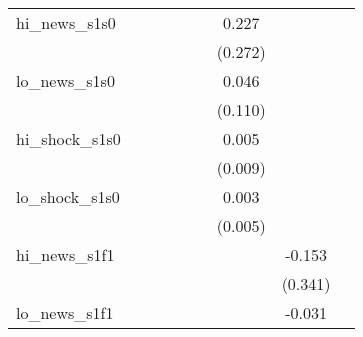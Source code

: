 {\begin{tabular}{l*{8}{c}}
\addlinespace
hi\_news\_s1s0&                     &                     &                     &                     &                     &       0.227         &                     &                     \\
            &                     &                     &                     &                     &                     &     (0.272)         &                     &                     \\
\addlinespace
lo\_news\_s1s0&                     &                     &                     &                     &                     &       0.046         &                     &                     \\
            &                     &                     &                     &                     &                     &     (0.110)         &                     &                     \\
\addlinespace
hi\_shock\_s1s0&                     &                     &                     &                     &                     &       0.005         &                     &                     \\
            &                     &                     &                     &                     &                     &     (0.009)         &                     &                     \\
\addlinespace
lo\_shock\_s1s0&                     &                     &                     &                     &                     &       0.003         &                     &                     \\
            &                     &                     &                     &                     &                     &     (0.005)         &                     &                     \\
\addlinespace
hi\_news\_s1f1&                     &                     &                     &                     &                     &                     &      -0.153         &                     \\
            &                     &                     &                     &                     &                     &                     &     (0.341)         &                     \\
\addlinespace
lo\_news\_s1f1&                     &                     &                     &                     &                     &                     &      -0.031         &                     \\

\end{tabular}}
